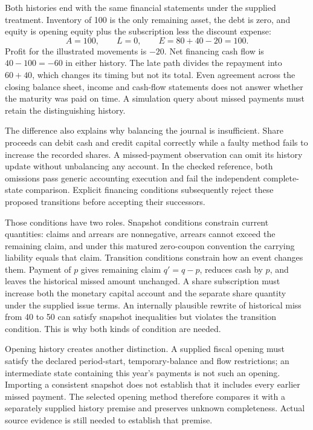 Both histories end with the same financial statements under the supplied
treatment. Inventory of 100 is the only remaining asset, the debt is zero,
and equity is opening equity plus the subscription less the discount expense:
\begin{equation}
 A=100,\qquad L=0,\qquad E=80+40-20=100.
\end{equation}
Profit for the illustrated movements is $-20$. Net financing cash flow is
$40-100=-60$ in either history. The late path divides the repayment into
$60+40$, which changes its timing but not its total. Even agreement across
the closing balance sheet, income and cash-flow statements does not answer
whether the maturity was paid on time. A simulation query about missed
payments must retain the distinguishing history.

The difference also explains why balancing the journal is insufficient. Share
proceeds can debit cash and credit capital correctly while a faulty method
fails to increase the recorded shares. A missed-payment observation can omit
its history update without unbalancing any account. In the checked reference,
both omissions pass generic accounting execution and fail the independent
complete-state comparison. Explicit financing conditions subsequently reject
these proposed transitions before accepting their successors.

Those conditions have two roles. Snapshot conditions constrain current
quantities: claims and arrears are nonnegative, arrears cannot exceed the
remaining claim, and under this matured zero-coupon convention the carrying
liability equals that claim. Transition conditions constrain how an event
changes them. Payment of $p$ gives remaining claim $q'=q-p$, reduces cash by
$p$, and leaves the historical missed amount unchanged. A share subscription
must increase both the monetary capital account and the separate share
quantity under the supplied issue terms. An internally plausible rewrite of
historical miss from 40 to 50 can satisfy snapshot inequalities but violates
the transition condition. This is why both kinds of condition are needed.

Opening history creates another distinction. A supplied fiscal opening must
satisfy the declared period-start, temporary-balance and flow restrictions;
an intermediate state containing this year's payments is not such an opening.
Importing a consistent snapshot does not establish that it includes every
earlier missed payment. The selected opening method therefore compares it
with a separately supplied history premise and preserves unknown completeness.
Actual source evidence is still needed to establish that premise.

